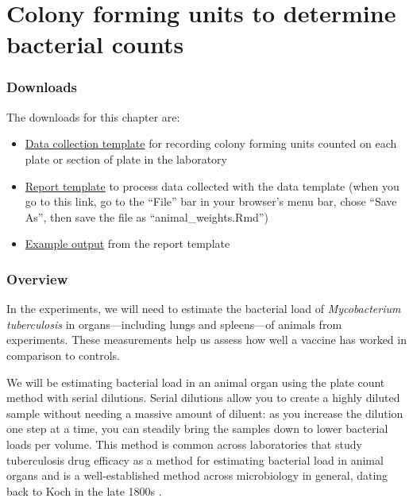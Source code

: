 \documentclass[
]{book}
\providecommand{\tightlist}{%
  \setlength{\itemsep}{0pt}\setlength{\parskip}{0pt}}
\begin{document}
\hypertarget{colony-forming-units-to-determine-bacterial-counts}{%
\chapter{Colony forming units to determine bacterial counts}\label{colony-forming-units-to-determine-bacterial-counts}}

\hypertarget{downloads-1}{%
\subsection{Downloads}\label{downloads-1}}

The downloads for this chapter are:

\begin{itemize}
\tightlist
\item
  \href{https://github.com/csu-impactb/CODING-TEAM-BOOKDOWN-/raw/main/templates/data_collection_templates/cfu_collection_template.xlsx}{Data collection template} for recording colony forming units counted on each
  plate or section of plate in the laboratory
\item
  \href{https://raw.githubusercontent.com/csu-impactb/CODING-TEAM-BOOKDOWN-/main/templates/report_templates/cfu_report.Rmd}{Report template} to process data collected with the data template (when you go to this link, go to the ``File'' bar in your browser's menu bar, chose ``Save As'', then save the file as ``animal\_weights.Rmd'')
\item
  \href{https://github.com/csu-impactb/CODING-TEAM-BOOKDOWN-/raw/main/templates/report_templates/cfu_report.docx}{Example output} from the report template
\end{itemize}

\hypertarget{overview-2}{%
\subsection{Overview}\label{overview-2}}

In the experiments, we will need to estimate the bacterial load of
\emph{Mycobacterium tuberculosis} in organs---including lungs and spleens---of
animals from experiments. These measurements help us assess how well a vaccine
has worked in comparison to controls.

We will be estimating bacterial load in an animal organ using the plate count
method with serial dilutions. Serial dilutions allow you to create a
highly diluted sample without needing a massive amount of diluent: as you
increase the dilution one step at a time, you can steadily bring the samples
down to lower bacterial loads per volume. This method is common across
laboratories that study tuberculosis drug efficacy as a method for estimating
bacterial load in animal organs \citep{franzblau2012comprehensive} and is a
well-established method across microbiology in general, dating back to Koch in
the late 1800s \citep{wilson1922proportion, ben2014estimation}.
\end{document}
